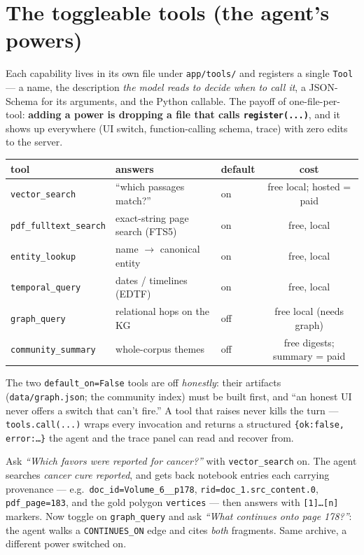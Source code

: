 \documentclass[11pt]{article}
\newcommand{\code}[1]{\texttt{#1}}
\begin{document}
\section{The toggleable tools (the agent's powers)}

Each capability lives in its own file under \code{app/tools/} and registers a
single \code{Tool} --- a name, the description \emph{the model reads to decide
when to call it}, a JSON-Schema for its arguments, and the Python callable. The
payoff of one-file-per-tool: \textbf{adding a power is dropping a file that calls
\code{register(...)}}, and it shows up everywhere (UI switch, function-calling
schema, trace) with zero edits to the server.

\begin{numbersbox}
\centering\small
\begin{tabular}{lllc}
\toprule
tool & answers & default & cost \\
\midrule
\code{vector\_search}        & ``which passages match?''        & on  & free local; hosted = paid \\
\code{pdf\_fulltext\_search} & exact-string page search (FTS5)  & on  & free, local \\
\code{entity\_lookup}        & name $\to$ canonical entity      & on  & free, local \\
\code{temporal\_query}       & dates / timelines (EDTF)         & on  & free, local \\
\code{graph\_query}          & relational hops on the KG        & off & free local (needs graph) \\
\code{community\_summary}    & whole-corpus themes              & off & free digests; summary = paid \\
\bottomrule
\end{tabular}
\end{numbersbox}

\noindent The two \code{default\_on=False} tools are off \emph{honestly}: their
artifacts (\code{data/graph.json}; the community index) must be built first, and
``an honest UI never offers a switch that can't fire.'' A tool that raises never
kills the turn --- \code{tools.call(...)} wraps every invocation and returns a
structured \code{\{ok:false, error:\dots\}} the agent and the trace panel can read
and recover from.

\begin{primerbox}
Ask \emph{``Which favors were reported for cancer?''} with \code{vector\_search}
on. The agent searches \emph{cancer cure reported}, and gets back notebook
entries each carrying provenance --- e.g.\ \code{doc\_id=Volume\_6\_\_p178},
\code{rid=doc\_1.src\_content.0}, \code{pdf\_page=183}, and the gold polygon
\code{vertices} --- then answers with \texttt{[1]\dots[n]} markers. Now toggle on
\code{graph\_query} and ask \emph{``What continues onto page 178?''}: the agent
walks a \code{CONTINUES\_ON} edge and cites \emph{both} fragments. Same archive,
a different power switched on.
\end{primerbox}
\end{document}
